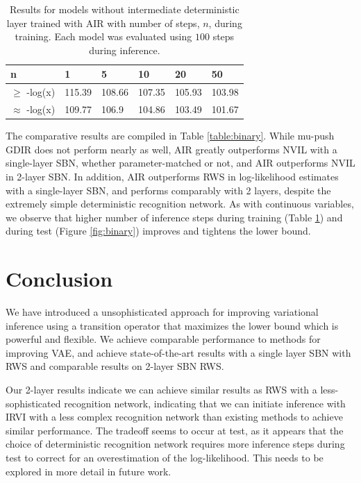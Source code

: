 \documentclass{article} %
\begin{document}
\begin{table}
\begin{tabular}{ | m{1.4cm} | m{1cm} | m{1cm} | m{1cm} | m{1cm} | m{1cm} |}
\hline
n & 1 & 5 & 10 & 20 & 50 \\
\hline
$\ge$ -log(x) & 115.39 & 108.66 & 107.35 & 105.93 & 103.98 \\
\hline
$\approx$ -log(x) & 109.77 & 106.9 & 104.86 & 103.49 & 101.67 \\
\hline
\end{tabular}
\caption{Results for models without intermediate deterministic layer trained with AIR with number of steps, $n$, during training. Each model was evaluated using $100$ steps during inference.}
\label{table:binary_step}
\end{table}

The comparative results are compiled in Table \ref{table:binary}. While mu-push GDIR does not perform nearly as well, AIR greatly outperforms NVIL with a single-layer SBN, whether parameter-matched or not, and AIR outperforms NVIL in 2-layer SBN. In addition, AIR outperforms RWS in log-likelihood estimates with a single-layer SBN, and performs comparably with 2 layers, despite the extremely simple deterministic recognition network. As with continuous variables, we observe that higher number of inference steps during training (Table \ref{table:binary_step}) and during test (Figure \ref{fig:binary}) improves and tightens the lower bound.

\section{Conclusion}
We have introduced a unsophisticated approach for improving variational inference using a transition operator that maximizes the lower bound which is powerful and flexible. We achieve comparable performance to methods for improving VAE, and achieve state-of-the-art results with a single layer SBN with RWS and comparable results on 2-layer SBN RWS.

Our 2-layer results indicate we can achieve similar results as RWS with a less-sophisticated recognition network, indicating that we can initiate inference with IRVI with a less complex recognition network than existing methods to achieve similar performance. The tradeoff seems to occur at test, as it appears that the choice of deterministic recognition network requires more inference steps during test to correct for an overestimation of the log-likelihood. This needs to be explored in more detail in future work.
\end{document}
